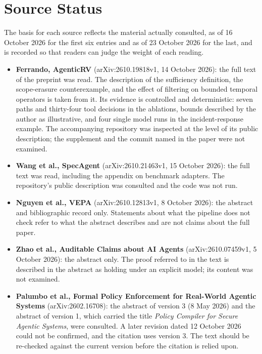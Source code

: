 \documentclass[11pt]{article}
\theoremstyle{definition}
\theoremstyle{remark}
\begin{document}
\appendix

\section{Source Status}\label{app:sources}

The basis for each source reflects the material actually consulted, as of 16 October 2026 for the first six entries and as of 23 October 2026 for the last, and is recorded so that readers can judge the weight of each reading.

\begin{itemize}
\item \textbf{Ferrando, AgenticRV} (arXiv:2610.19818v1, 14 October 2026): the full text of the preprint was read. The description of the sufficiency definition, the scope-erasure counterexample, and the effect of filtering on bounded temporal operators is taken from it. Its evidence is controlled and deterministic: seven paths and thirty-four tool decisions in the ablations, bounds described by the author as illustrative, and four single model runs in the incident-response example. The accompanying repository was inspected at the level of its public description; the supplement and the commit named in the paper were not examined.
\item \textbf{Wang et al., SpecAgent} (arXiv:2610.21463v1, 15 October 2026): the full text was read, including the appendix on benchmark adapters. The repository's public description was consulted and the code was not run.
\item \textbf{Nguyen et al., VEPA} (arXiv:2610.12813v1, 8 October 2026): the abstract and bibliographic record only. Statements about what the pipeline does not check refer to what the abstract describes and are not claims about the full paper.
\item \textbf{Zhao et al., Auditable Claims about AI Agents} (arXiv:2610.07459v1, 5 October 2026): the abstract only. The proof referred to in the text is described in the abstract as holding under an explicit model; its content was not examined.
\item \textbf{Palumbo et al., Formal Policy Enforcement for Real-World Agentic Systems} (arXiv:2602.16708): the abstract of version 3 (8 May 2026) and the abstract of version 1, which carried the title \emph{Policy Compiler for Secure Agentic Systems}, were consulted. A later revision dated 12 October 2026 could not be confirmed, and the citation uses version 3. The text should be re-checked against the current version before the citation is relied upon.

\end{itemize}
\end{document}
